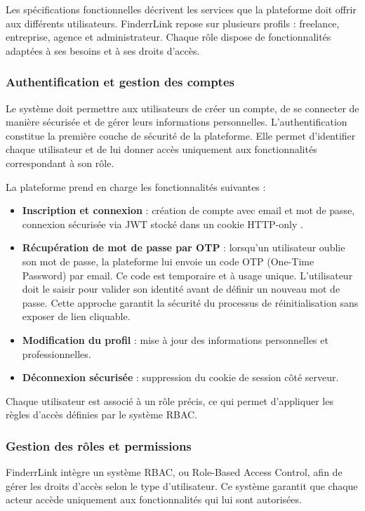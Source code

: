 Les spécifications fonctionnelles décrivent les services que la plateforme doit offrir aux différents utilisateurs. FinderrLink repose sur plusieurs profils : freelance, entreprise, agence et administrateur. Chaque rôle dispose de fonctionnalités adaptées à ses besoins et à ses droits d'accès.

\subsubsection{Authentification et gestion des comptes}

Le système doit permettre aux utilisateurs de créer un compte, de se connecter de manière sécurisée et de gérer leurs informations personnelles. L'authentification constitue la première couche de sécurité de la plateforme. Elle permet d'identifier chaque utilisateur et de lui donner accès uniquement aux fonctionnalités correspondant à son rôle.

La plateforme prend en charge les fonctionnalités suivantes :

\begin{itemize}
    \item \textbf{Inscription et connexion} : création de compte avec email et mot de passe, connexion sécurisée via JWT stocké dans un cookie HTTP-only \cite{jwt}.
    \item \textbf{Récupération de mot de passe par OTP} : lorsqu'un utilisateur oublie son mot de passe, la plateforme lui envoie un code OTP (One-Time Password) par email. Ce code est temporaire et à usage unique. L'utilisateur doit le saisir pour valider son identité avant de définir un nouveau mot de passe. Cette approche garantit la sécurité du processus de réinitialisation sans exposer de lien cliquable.
    \item \textbf{Modification du profil} : mise à jour des informations personnelles et professionnelles.
    \item \textbf{Déconnexion sécurisée} : suppression du cookie de session côté serveur.
\end{itemize}

Chaque utilisateur est associé à un rôle précis, ce qui permet d'appliquer les règles d'accès définies par le système RBAC.

\subsubsection{Gestion des rôles et permissions}

FinderrLink intègre un système RBAC, ou Role-Based Access Control, afin de gérer les droits d'accès selon le type d'utilisateur. Ce système garantit que chaque acteur accède uniquement aux fonctionnalités qui lui sont autorisées.

